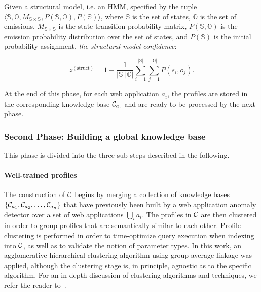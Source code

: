 \begin{definition}
  Given a structural model, i.e. an \ac{HMM}, specified by the tuple $\langle\mathbb{S},\mathbb{O},M_{\mathbb{S}\times\mathbb{S}}, P\left(\mathbb{S},\mathbb{O}\right),P\left(\mathbb{S}\right)\rangle$, where $\mathbb{S}$ is the set of states, $\mathbb{O}$ is the set of emissions, $M_{\mathbb{S}\times\mathbb{S}}$ is the state transition probability matrix, $P\left(\mathbb{S},\mathbb{O}\right)$ is the emission probability distribution over the set of states, and $P\left(\mathbb{S}\right)$ is the initial probability assignment, \emph{the structural model confidence}:

\begin{equation}
  z^{\left(\text{struct}\right)}=1-
  \frac{1}{\left|\mathbb{S}\right|\left|\mathbb{O}\right|}
  \sum_{i=1}^{\left|\mathbb{S}\right|}
  \sum_{j=1}^{\left|\mathbb{O}\right|}P\left(s_i,o_j\right).
\end{equation}
\end{definition}

At the end of this phase, for each web application $a_{i}$, the profiles are stored in the corresponding knowledge base $\mathcal{C}_{a_{i}}$ and are ready to be processed by the next phase.

\subsubsection{Second Phase: Building a global knowledge base}
\label{web:longtail:design:global}
This phase is divided into the three sub-steps described in the following.

\paragraph{Well-trained profiles}
The construction of $\mathcal{C}$ begins by merging a collection of knowledge bases $\left\{\mathcal{C}_{a_1},\mathcal{C}_{a_2},\ldots,\mathcal{C}_{a_n}\right\}$ that have previously been built by a web application anomaly detector over a set of web applications $\bigcup_{i}a_i$.  The profiles in $\mathcal{C}$ are then clustered in order to group profiles that are semantically similar to each other.  Profile clustering is performed in order to time-optimize query execution when indexing into $\mathcal{C}$, as well as to validate the notion of parameter types.  In this work, an agglomerative hierarchical clustering algorithm using group average linkage was applied, although the clustering stage is, in principle, agnostic as to the specific algorithm.  For an in-depth discussion of clustering algorithms and techniques, we refer the reader to~\citep{clustering:survey}.

